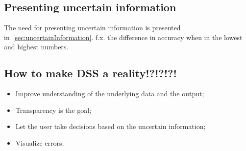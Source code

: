 \subsection{Presenting uncertain information}
The need for presenting uncertain information is presented in~\ref{sec:uncertainInformation}.
f.x. the difference in accuracy when in the lowest and highest numbers.

\subsection{How to make DSS a reality!?!?!?!}
\begin{itemize}
\item Improve understanding of the underlying data and the output;
\item Transparency is the goal;
\item Let the user take decisions based on the uncertain information;
\item Visualize errors;
\end{itemize}


